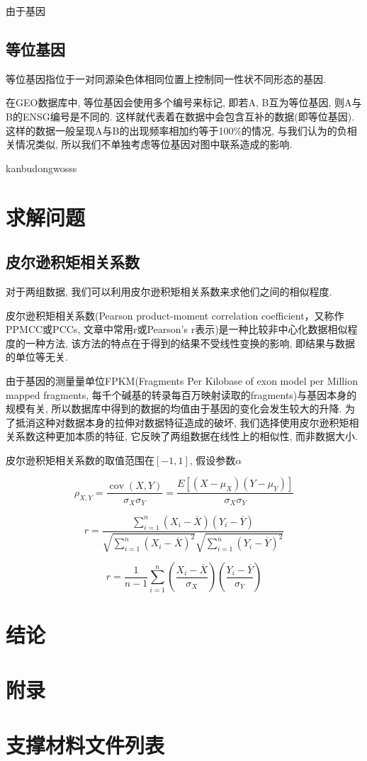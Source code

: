\documentclass[zihao=-4]{ctexart}
\begin{document}
由于基因

\subsection{等位基因}
等位基因指位于一对同源染色体相同位置上控制同一性状不同形态的基因.

在GEO数据库中, 等位基因会使用多个编号来标记, 即若A, B互为等位基因, 则A与B的ENSG编号是不同的. 这样就代表着在数据中会包含互补的数据(即等位基因). 这样的数据一般呈现A与B的出现频率相加约等于100\%的情况, 与我们认为的负相关情况类似, 所以我们不单独考虑等位基因对图中联系造成的影响.

kanbudong\cite{ranger}wosss
\section{求解问题}
\subsection{皮尔逊积矩相关系数}
对于两组数据, 我们可以利用皮尔逊积矩相关系数\cite{wiki:pierxun}来求他们之间的相似程度. 

皮尔逊积矩相关系数(Pearson product-moment correlation coefficient，又称作PPMCC或PCCs, 文章中常用r或Pearson's r表示)是一种比较非中心化数据相似程度的一种方法, 该方法的特点在于得到的结果不受线性变换的影响, 即结果与数据的单位等无关.

由于基因的测量量单位FPKM(Fragments Per Kilobase of exon model per Million mapped fragments, 每千个碱基的转录每百万映射读取的fragments)与基因本身的规模有关, 所以数据库中得到的数据的均值由于基因的变化会发生较大的升降. 为了抵消这种对数据本身的拉伸对数据特征造成的破坏, 我们选择使用皮尔逊积矩相关系数这种更加本质的特征, 它反映了两组数据在线性上的相似性, 而非数据大小. 

皮尔逊积矩相关系数的取值范围在$[-1,1]$, 假设参数$\alpha$

\begin{equation}
    \rho_{X, Y}=\frac{\operatorname{cov}(X, Y)}{\sigma_{X} \sigma_{Y}}=\frac{E\left[\left(X-\mu_{X}\right)\left(Y-\mu_{Y}\right)\right]}{\sigma_{X} \sigma_{Y}}
\end{equation}

\begin{equation}
    r=\frac{\sum_{i=1}^{n}\left(X_{i}-\overline{X}\right)\left(Y_{i}-\overline{Y}\right)}{\sqrt{\sum_{i=1}^{n}\left(X_{i}-\overline{X}\right)^{2}} \sqrt{\sum_{i=1}^{n}\left(Y_{i}-\overline{Y}\right)^{2}}}
\end{equation}

\begin{equation}
    r=\frac{1}{n-1} \sum_{i=1}^{n}\left(\frac{X_{i}-\overline{X}}{\sigma_{X}}\right)\left(\frac{Y_{i}-\overline{Y}}{\sigma_{Y}}\right)
\end{equation}

\newpage
\section*{结论}


\newpage
\section*{附录}



\section*{支撑材料文件列表}
\end{document}
